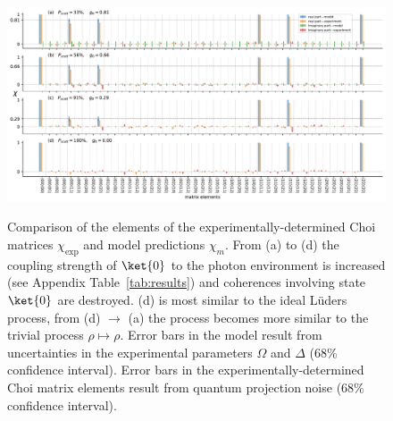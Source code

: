 \documentclass[
aps,prl,
reprint,
a4paper,
superscriptaddress,
floatfix,
]{revtex4-1}
\begin{document}
\begin{turnpage}
\begin{figure}[h]
\centering
\includegraphics[width=\linewidth]{data+model+error.pdf}
\label{fig:exp+data}
\caption{Comparison of the elements of the experimentally-determined Choi matrices $\chi_\mathrm{exp}$ and model predictions $\chi_m$.
From (a) to (d) the coupling strength of $\ket{0}$ to the photon environment is increased (see Appendix Table~\ref{tab:results}) and coherences involving state $\ket{0}$ are destroyed.
(d) is most similar to the ideal Lüders process, from (d) $\rightarrow$ (a) the process becomes more similar to the trivial process $\rho \mapsto \rho$.
Error bars in the model result from uncertainties in the experimental parameters $\Omega$ and $\Delta$ (68\% confidence interval).
Error bars in the experimentally-determined Choi matrix elements result from quantum projection noise (68\% confidence interval).}
\end{figure}
\end{turnpage}

\end{document}
